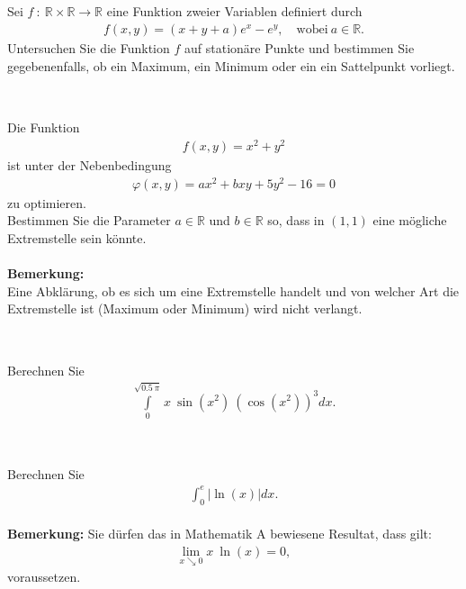 \subsection*{}
Sei $ f \ : \ \mathbb{R} \times \mathbb{R} \to \mathbb{R} $ eine Funktion zweier Variablen definiert durch
\begin{align*}
f(x,y) = (x+y+a) e^x - e^y, \quad \textrm{wobei} \ a \in \mathbb{R}.
\end{align*}
Untersuchen Sie die Funktion $ f $ auf stationäre Punkte und bestimmen Sie gegebenenfalls, ob ein Maximum, ein Minimum oder ein ein Sattelpunkt vorliegt.
\\
\\
\subsection*{}
Die Funktion
\begin{align*}
f(x,y) = x^2 + y^2
\end{align*}
ist unter der Nebenbedingung
\begin{align*}
\varphi(x,y)
=
a x^2 +bxy+5y^2-16 = 0
\end{align*}
zu optimieren.\\
Bestimmen Sie die Parameter $ a \in \mathbb{R} $ und $ b \in \mathbb{R} $ so, dass in $ (1,1) $ eine mögliche Extremstelle sein könnte.\\
\\
\textbf{Bemerkung:} \\
Eine Abklärung, ob es sich um eine Extremstelle handelt und von welcher Art die Extremstelle ist (Maximum oder Minimum) wird nicht verlangt.
\\
\\
\subsection*{}
Berechnen Sie 
\begin{align*}
\int
\limits_0^{\sqrt{0.5 \ \pi}} x \ \sin(x^2) \ \left(\cos(x^2)\right)^3 dx.
\end{align*}
\ \\
\subsection*{}
Berechnen Sie 
\begin{align*}
\int_0^e |\ln(x)| dx.
\end{align*}
\ \\
\textbf{Bemerkung:} Sie dürfen das in Mathematik A bewiesene Resultat, dass gilt:
\begin{align*}
\lim \limits_{x \searrow 0} x \ \ln(x) = 0,
\end{align*}
voraussetzen.

